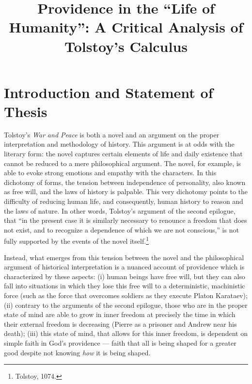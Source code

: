 \documentclass[12pt]{article}
\begin{document}
\title{Providence in the ``Life of Humanity'': A Critical Analysis of Tolstoy's Calculus}
\date{\vspace{-1in}} %
\maketitle
\section{Introduction and Statement of Thesis}

Tolstoy's \emph{War and Peace} is both a novel and an argument on the proper interpretation and methodology of history. This argument is at odds with the literary form: the novel captures certain elements of life and daily existence that cannot be reduced to a mere philosophical argument. The novel, for example, is able to evoke strong emotions and empathy with the characters. In this dichotomy of forms, the tension between independence of personality, also known as free will, and the laws of history is palpable. This very dichotomy points to the difficulty of reducing human life, and consequently, human history to reason and the laws of nature. In other words, Tolstoy's argument of the second epilogue, that ``in the present case it is similarly necessary to renounce a freedom that does not exist, and to recognize a dependence of which we are not conscious,'' is not fully supported by the events of the novel itself.\footnote{Tolstoy, 1074.}

Instead, what emerges from this tension between the novel and the philosophical argument of historical interpretation is a nuanced account of providence which is characterized by these aspects: (i) human beings have free will, but they can also fall into situations in which they lose this free will to a deterministic, machinistic force (such as the force that overcomes soldiers as they execute Platon Karataev); (ii) contrary to the arguments of the second epilogue, those who are in the proper state of mind are able to grow in inner freedom at precisely the time in which their external freedom is decreasing (Pierre as a prisoner and Andrew near his death); (iii) this state of mind, that allows for this inner freedom, is dependent on simple faith in God’s providence — faith that all is being shaped for a greater good despite not knowing \emph{how} it is being shaped.
\end{document}
